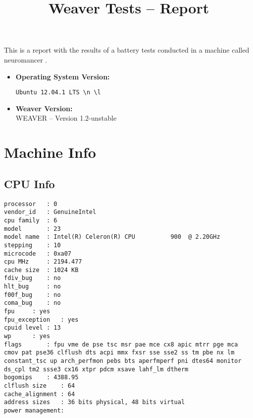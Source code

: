 \documentclass{article}
\title{Weaver Tests -- Report}
\begin{document}
\maketitle
This is a report with the results of a battery
tests conducted in a machine called 
neuromancer
.
\begin{itemize}
\item
\textbf{Operating System Version: }
\begin{verbatim}
Ubuntu 12.04.1 LTS \n \l

\end{verbatim}
\item
\textbf{Weaver Version: }\\
WEAVER -- Version 1.2-unstable
\end{itemize}
\section{Machine Info}
\subsection{CPU Info}
\begin{verbatim}
processor	: 0
vendor_id	: GenuineIntel
cpu family	: 6
model		: 23
model name	: Intel(R) Celeron(R) CPU          900  @ 2.20GHz
stepping	: 10
microcode	: 0xa07
cpu MHz		: 2194.477
cache size	: 1024 KB
fdiv_bug	: no
hlt_bug		: no
f00f_bug	: no
coma_bug	: no
fpu		: yes
fpu_exception	: yes
cpuid level	: 13
wp		: yes
flags		: fpu vme de pse tsc msr pae mce cx8 apic mtrr pge mca cmov pat pse36 clflush dts acpi mmx fxsr sse sse2 ss tm pbe nx lm constant_tsc up arch_perfmon pebs bts aperfmperf pni dtes64 monitor ds_cpl tm2 ssse3 cx16 xtpr pdcm xsave lahf_lm dtherm
bogomips	: 4388.95
clflush size	: 64
cache_alignment	: 64
address sizes	: 36 bits physical, 48 bits virtual
power management:

\end{verbatim}
\end{document}

